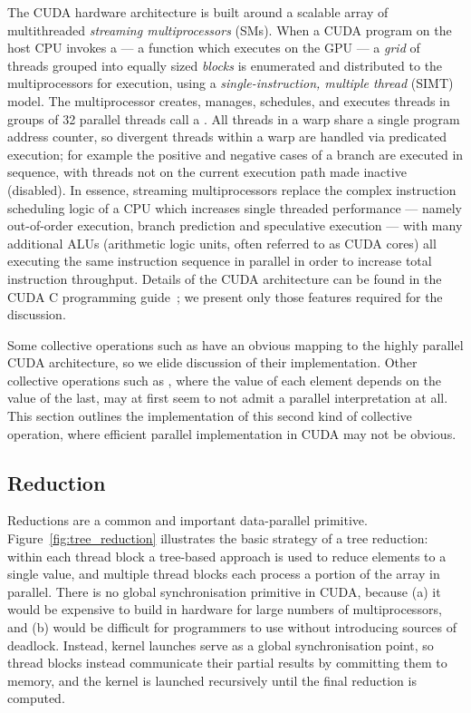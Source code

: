 The CUDA hardware architecture is built around a scalable array of multithreaded
\emph{streaming multiprocessors} (SMs). When a CUDA program on the host
CPU invokes a  --- a function which executes on the GPU --- a
\emph{grid} of threads grouped into equally sized \emph{blocks} is
enumerated and distributed to the multiprocessors for execution, using a
\emph{single-instruction, multiple thread} (SIMT) model. The
multiprocessor creates, manages, schedules, and executes threads in groups of 32
parallel threads call a . All threads in a warp share a single
program address counter, so divergent threads within a warp are handled via
predicated execution; for example the positive and negative cases of a branch
are executed in sequence, with threads not on the current execution path made
inactive (disabled). In essence, streaming multiprocessors replace the complex
instruction scheduling logic of a CPU which increases single threaded
performance --- namely out-of-order execution, branch prediction and speculative
execution --- with many additional ALUs (arithmetic logic units, often referred
to as CUDA cores) all executing the same instruction sequence in parallel in
order to increase total instruction throughput. Details of the CUDA architecture
can be found in the CUDA C programming guide~\cite{NVIDIA:2012wf}; we present
only those features required for the discussion.

Some collective operations such as  have an obvious mapping to the
highly parallel CUDA architecture, so we elide discussion of their
implementation. Other collective operations such as , where the value
of each element depends on the value of the last, may at first seem to not admit
a parallel interpretation at all. This section outlines the implementation of
this second kind of collective operation, where efficient parallel
implementation in CUDA may not be obvious.


\subsection{Reduction}
\label{sec:parallel_reduction}

Reductions are a common and important data-parallel primitive.
Figure~\ref{fig:tree_reduction} illustrates the basic strategy of a tree
reduction: within each thread block a tree-based approach is used to reduce
elements to a single value, and multiple thread blocks each process a portion of
the array in parallel. There is no global synchronisation primitive in CUDA,
because (a) it would be expensive to build in hardware for large numbers of
multiprocessors, and (b) would be difficult for programmers to use without
introducing sources of deadlock. Instead, kernel launches serve as a global
synchronisation point, so thread blocks instead communicate their partial
results by committing them to memory, and the kernel is launched recursively
until the final reduction is computed.

